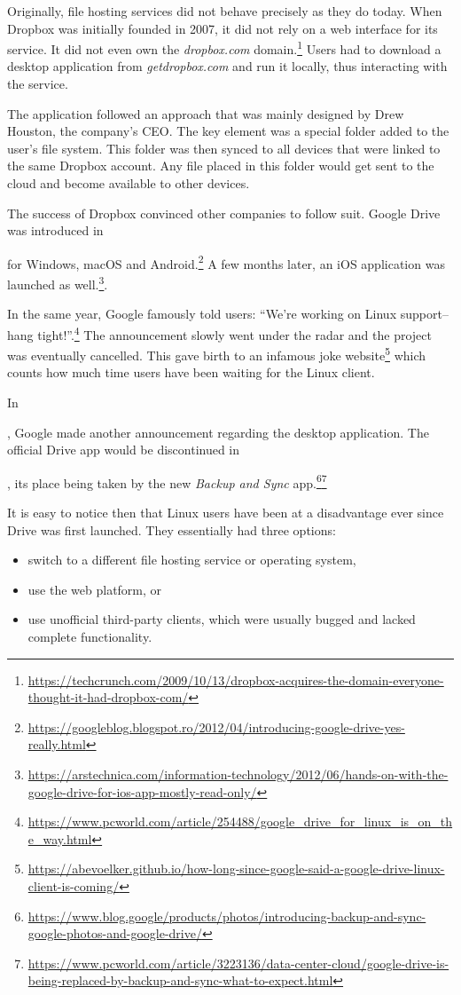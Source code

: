 Originally, file hosting services did not behave precisely as they do today. When Dropbox was initially founded in 2007, it did not rely on a web interface for its service. It did not even own the \emph{dropbox.com} domain.\footnote{\url{https://techcrunch.com/2009/10/13/dropbox-acquires-the-domain-everyone-thought-it-had-dropbox-com/}} Users had to download a desktop application from \emph{getdropbox.com} and run it locally, thus interacting with the service.

The application followed an approach that was mainly designed by Drew Houston, the company's CEO. The key element was a special folder added to the user's file system. This folder was then synced to all devices that were linked to the same Dropbox account. Any file placed in this folder would get sent to the cloud and become available to other devices.

The success of Dropbox convinced other companies to follow suit. Google Drive was introduced in \date{April 2012} for Windows, macOS and Android.\footnote{\url{https://googleblog.blogspot.ro/2012/04/introducing-google-drive-yes-really.html}} A few months later, an iOS application was launched as well.\footnote{\url{https://arstechnica.com/information-technology/2012/06/hands-on-with-the-google-drive-for-ios-app-mostly-read-only/}}.

In the same year, Google famously told users: ``We're working on Linux support--hang tight!''.\footnote{\url{https://www.pcworld.com/article/254488/google_drive_for_linux_is_on_the_way.html}} The announcement slowly went under the radar and the project was eventually cancelled. This gave birth to an infamous joke website\footnote{\url{https://abevoelker.github.io/how-long-since-google-said-a-google-drive-linux-client-is-coming/}} which counts how much time users have been waiting for the Linux client.

In \date{September 2017}, Google made another announcement regarding the desktop application. The official Drive app would be discontinued in \date{March 2018}, its place being taken by the new \emph{Backup and Sync} app.\footnote{\url{https://www.blog.google/products/photos/introducing-backup-and-sync-google-photos-and-google-drive/}}\footnote{\url{https://www.pcworld.com/article/3223136/data-center-cloud/google-drive-is-being-replaced-by-backup-and-sync-what-to-expect.html}}

It is easy to notice then that Linux users have been at a disadvantage ever since Drive was first launched. They essentially had three options:
\begin{itemize}
\item switch to a different file hosting service or operating system,
\item use the web platform, or
\item use unofficial third-party clients, which were usually bugged and lacked complete functionality.
\end{itemize}

